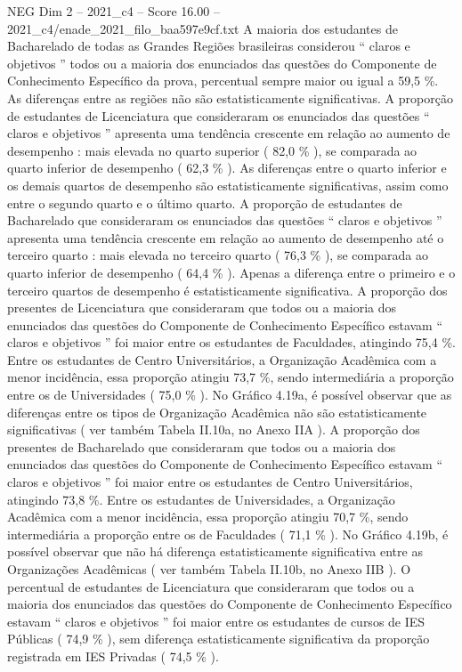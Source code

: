 \begin{textsample}{NEG Dim 2 – 2021\_c4 – Score 16.00 – 2021\_c4/enade\_2021\_filo\_baa597e9cf.txt}
A maioria dos estudantes de Bacharelado de todas as Grandes Regiões brasileiras considerou “ claros e objetivos ” todos ou a maioria dos enunciados das questões do Componente de Conhecimento Específico da prova, percentual sempre maior ou igual a 59,5 \%.
As diferenças entre as regiões não são estatisticamente significativas.
A proporção de estudantes de Licenciatura que consideraram os enunciados das questões “ claros e objetivos ” apresenta uma tendência crescente em relação ao aumento de desempenho : mais elevada no quarto superior ( 82,0 \% ), se comparada ao quarto inferior de desempenho ( 62,3 \% ).
As diferenças entre o quarto inferior e os demais quartos de desempenho são estatisticamente significativas, assim como entre o segundo quarto e o último quarto.
A proporção de estudantes de Bacharelado que consideraram os enunciados das questões “ claros e objetivos ” apresenta uma tendência crescente em relação ao aumento de desempenho até o terceiro quarto : mais elevada no terceiro quarto ( 76,3 \% ), se comparada ao quarto inferior de desempenho ( 64,4 \% ).
Apenas a diferença entre o primeiro e o terceiro quartos de desempenho é estatisticamente significativa.
A proporção dos presentes de Licenciatura que consideraram que todos ou a maioria dos enunciados das questões do Componente de Conhecimento Específico estavam “ claros e objetivos ” foi maior entre os estudantes de Faculdades, atingindo 75,4 \%.
Entre os estudantes de Centro Universitários, a Organização Acadêmica com a menor incidência, essa proporção atingiu 73,7 \%, sendo intermediária a proporção entre os de Universidades ( 75,0 \% ).
No Gráfico 4.19a, é possível observar que as diferenças entre os tipos de Organização Acadêmica não são estatisticamente significativas ( ver também Tabela II.10a, no Anexo IIA ).
A proporção dos presentes de Bacharelado que consideraram que todos ou a maioria dos enunciados das questões do Componente de Conhecimento Específico estavam “ claros e objetivos ” foi maior entre os estudantes de Centro Universitários, atingindo 73,8 \%.
Entre os estudantes de Universidades, a Organização Acadêmica com a menor incidência, essa proporção atingiu 70,7 \%, sendo intermediária a proporção entre os de Faculdades ( 71,1 \% ).
No Gráfico 4.19b, é possível observar que não há diferença estatisticamente significativa entre as Organizações Acadêmicas ( ver também Tabela II.10b, no Anexo IIB ).
O percentual de estudantes de Licenciatura que consideraram que todos ou a maioria dos enunciados das questões do Componente de Conhecimento Específico estavam “ claros e objetivos ” foi maior entre os estudantes de cursos de IES Públicas ( 74,9 \% ), sem diferença estatisticamente significativa da proporção registrada em IES Privadas ( 74,5 \% ).

\end{textsample}
